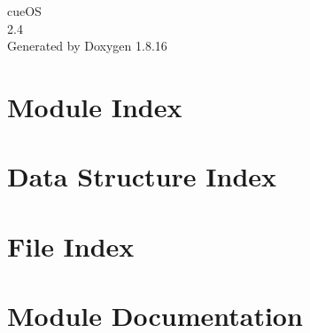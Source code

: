 \let\mypdfximage\pdfximage\def\pdfximage{\immediate\mypdfximage}\documentclass[twoside]{book}
\newcommand{\+}{\discretionary{\mbox{\scriptsize$\hookleftarrow$}}{}{}}
\newcommand{\clearemptydoublepage}{%
  \newpage{\pagestyle{empty}\cleardoublepage}%
}
\begin{document}
\hypersetup{pageanchor=false,
             bookmarksnumbered=true,
             pdfencoding=unicode
            }
\begin{titlepage}
\vspace*{7cm}
\begin{center}%
{\Large cue\+OS \\[1ex]\large 2.\+4 }\\
\vspace*{1cm}
{\large Generated by Doxygen 1.8.16}\\
\end{center}
\end{titlepage}
\clearemptydoublepage
{}
\tableofcontents
\clearemptydoublepage
{}
\hypersetup{pageanchor=true}

\chapter{Module Index}

\chapter{Data Structure Index}

\chapter{File Index}

\chapter{Module Documentation}





























\end{document}
